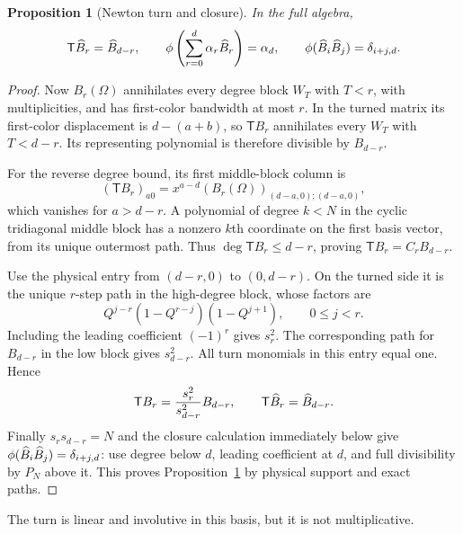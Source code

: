\documentclass[11pt]{article}
\numberwithin{equation}{section}
\newtheorem{proposition}[theorem]{Proposition}
\theoremstyle{definition}\newtheorem{definition}[theorem]{Definition}
\theoremstyle{remark}\newtheorem{remark}[theorem]{Remark}
\newcommand{\Turn}{\mathsf T}\newcommand{\Cheb}{\mathsf C}
\begin{document}
\begin{proposition}[Newton turn and closure]\label{prop:newton-turn}
In the full algebra,
\begin{equation}\label{eq:newton-turn}
 \Turn\Bhat_r=\Bhat_{d-r},\qquad
 \phi\left(\sum_{r=0}^{d}\alpha_r\Bhat_r\right)=\alpha_d,
 \qquad
 \phi(\Bhat_i\Bhat_j)=\delta_{i+j,d}.
\end{equation}
\end{proposition}
\begin{proof}
Now $B_r(\Omega)$ annihilates every degree block $W_T$ with $T<r$, with multiplicities, and has first-color bandwidth at most $r$. In the turned matrix its first-color displacement is $d-(a+b)$, so $\Turn B_r$ annihilates every $W_T$ with $T<d-r$. Its representing polynomial is therefore divisible by $B_{d-r}$.

For the reverse degree bound, its first middle-block column is
\[
 (\Turn B_r)_{a0}=x^{a-d}(B_r(\Omega))_{(d-a,0);(d-a,0)},
\]
which vanishes for $a>d-r$. A polynomial of degree $k<N$ in the cyclic tridiagonal middle block has a nonzero $k$th coordinate on the first basis vector, from its unique outermost path. Thus $\deg\Turn B_r\le d-r$, proving $\Turn B_r=C_rB_{d-r}$.

Use the physical entry from $(d-r,0)$ to $(0,d-r)$. On the turned side it is the unique $r$-step path in the high-degree block, whose factors are
\[
 Q^{j-r}(1-Q^{r-j})(1-Q^{j+1}),\qquad0\le j<r.
\]
Including the leading coefficient $(-1)^r$ gives $s_r^2$. The corresponding path for $B_{d-r}$ in the low block gives $s_{d-r}^2$. All turn monomials in this entry equal one. Hence
\[
 \Turn B_r=\frac{s_r^2}{s_{d-r}^2}B_{d-r},
 \qquad \Turn\Bhat_r=\Bhat_{d-r}.
\]
Finally $s_rs_{d-r}=N$ and the closure calculation immediately below give
$\phi(\widehat B_i\widehat B_j)=\delta_{i+j,d}$: use degree below $d$, leading coefficient at $d$, and full divisibility by $P_N$ above it. This proves Proposition~\ref{prop:newton-turn} by physical support and exact paths.

\end{proof}
The turn is linear and involutive in this basis, but it is not multiplicative.
\end{document}
